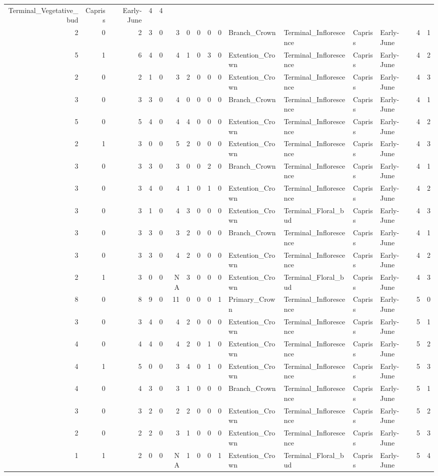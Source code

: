 \documentclass[]{article}
\begin{document}
\begin{longtable}[]{@{}rrrrrrrrrrllllrl@{}}
Terminal\_Vegetative\_bud & Capriss & Early-June & 4 & 4\tabularnewline
2 & 0 & 2 & 3 & 0 & 3 & 0 & 0 & 0 & 0 & Branch\_Crown &
Terminal\_Inflorescence & Capriss & Early-June & 4 & 1\tabularnewline
5 & 1 & 6 & 4 & 0 & 4 & 1 & 0 & 3 & 0 & Extention\_Crown &
Terminal\_Inflorescence & Capriss & Early-June & 4 & 2\tabularnewline
2 & 0 & 2 & 1 & 0 & 3 & 2 & 0 & 0 & 0 & Extention\_Crown &
Terminal\_Inflorescence & Capriss & Early-June & 4 & 3\tabularnewline
3 & 0 & 3 & 3 & 0 & 4 & 0 & 0 & 0 & 0 & Branch\_Crown &
Terminal\_Inflorescence & Capriss & Early-June & 4 & 1\tabularnewline
5 & 0 & 5 & 4 & 0 & 4 & 4 & 0 & 0 & 0 & Extention\_Crown &
Terminal\_Inflorescence & Capriss & Early-June & 4 & 2\tabularnewline
2 & 1 & 3 & 0 & 0 & 5 & 2 & 0 & 0 & 0 & Extention\_Crown &
Terminal\_Inflorescence & Capriss & Early-June & 4 & 3\tabularnewline
3 & 0 & 3 & 3 & 0 & 3 & 0 & 0 & 2 & 0 & Branch\_Crown &
Terminal\_Inflorescence & Capriss & Early-June & 4 & 1\tabularnewline
3 & 0 & 3 & 4 & 0 & 4 & 1 & 0 & 1 & 0 & Extention\_Crown &
Terminal\_Inflorescence & Capriss & Early-June & 4 & 2\tabularnewline
3 & 0 & 3 & 1 & 0 & 4 & 3 & 0 & 0 & 0 & Extention\_Crown &
Terminal\_Floral\_bud & Capriss & Early-June & 4 & 3\tabularnewline
3 & 0 & 3 & 3 & 0 & 3 & 2 & 0 & 0 & 0 & Branch\_Crown &
Terminal\_Inflorescence & Capriss & Early-June & 4 & 1\tabularnewline
3 & 0 & 3 & 3 & 0 & 4 & 2 & 0 & 0 & 0 & Extention\_Crown &
Terminal\_Inflorescence & Capriss & Early-June & 4 & 2\tabularnewline
2 & 1 & 3 & 0 & 0 & NA & 3 & 0 & 0 & 0 & Extention\_Crown &
Terminal\_Floral\_bud & Capriss & Early-June & 4 & 3\tabularnewline
8 & 0 & 8 & 9 & 0 & 11 & 0 & 0 & 0 & 1 & Primary\_Crown &
Terminal\_Inflorescence & Capriss & Early-June & 5 & 0\tabularnewline
3 & 0 & 3 & 4 & 0 & 4 & 2 & 0 & 0 & 0 & Extention\_Crown &
Terminal\_Inflorescence & Capriss & Early-June & 5 & 1\tabularnewline
4 & 0 & 4 & 4 & 0 & 4 & 2 & 0 & 1 & 0 & Extention\_Crown &
Terminal\_Inflorescence & Capriss & Early-June & 5 & 2\tabularnewline
4 & 1 & 5 & 0 & 0 & 3 & 4 & 0 & 1 & 0 & Extention\_Crown &
Terminal\_Inflorescence & Capriss & Early-June & 5 & 3\tabularnewline
4 & 0 & 4 & 3 & 0 & 3 & 1 & 0 & 0 & 0 & Branch\_Crown &
Terminal\_Inflorescence & Capriss & Early-June & 5 & 1\tabularnewline
3 & 0 & 3 & 2 & 0 & 2 & 2 & 0 & 0 & 0 & Extention\_Crown &
Terminal\_Inflorescence & Capriss & Early-June & 5 & 2\tabularnewline
2 & 0 & 2 & 2 & 0 & 3 & 1 & 0 & 0 & 0 & Extention\_Crown &
Terminal\_Inflorescence & Capriss & Early-June & 5 & 3\tabularnewline
1 & 1 & 2 & 0 & 0 & NA & 1 & 0 & 0 & 1 & Extention\_Crown &
Terminal\_Floral\_bud & Capriss & Early-June & 5 & 4\tabularnewline

\end{longtable}
\end{document}
